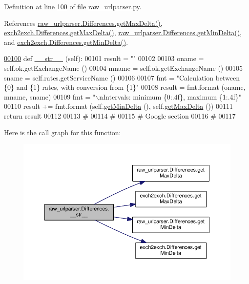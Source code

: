 Definition at line \hyperlink{raw__urlparser_8py_source_l00100}{100} of file \hyperlink{raw__urlparser_8py_source}{raw\+\_\+urlparser.\+py}.



References \hyperlink{raw__urlparser_8py_source_l00097}{raw\+\_\+urlparser.\+Differences.\+get\+Max\+Delta()}, \hyperlink{exch2exch_8py_source_l00130}{exch2exch.\+Differences.\+get\+Max\+Delta()}, \hyperlink{raw__urlparser_8py_source_l00094}{raw\+\_\+urlparser.\+Differences.\+get\+Min\+Delta()}, and \hyperlink{exch2exch_8py_source_l00127}{exch2exch.\+Differences.\+get\+Min\+Delta()}.


\begin{DoxyCode}
\hypertarget{classraw__urlparser_1_1_differences.tex_l00100}{}\hyperlink{classraw__urlparser_1_1_differences_ae30a248dbbe9fde42b0bcbd81160f070}{00100}     \textcolor{keyword}{def }\hyperlink{classraw__urlparser_1_1_differences_ae30a248dbbe9fde42b0bcbd81160f070}{\_\_str\_\_} (self):
00101         result = \textcolor{stringliteral}{""}
00102         
00103         oname = self.ok.getExchangeName ()
00104         mname = self.ok.getExchangeName ()
00105         sname = self.rates.getServiceName ()
00106         
00107         fmt = \textcolor{stringliteral}{"Calculation between \{0\} and \{1\} rates, with conversion from \{1\}"}
00108         result = fmt.format (oname, mname, sname)
00109         fmt = \textcolor{stringliteral}{"\(\backslash\)nIntervals: minimum \{0:.4f\}, maximum \{1:.4f\}"}
00110         result += fmt.format (self.\hyperlink{classraw__urlparser_1_1_differences_af19faaea85ca8ac0d327c8443ddd99ef}{getMinDelta} (), self.\hyperlink{classraw__urlparser_1_1_differences_acfa09d743c08cc813a5bc435aa6875da}{getMaxDelta} ())
00111         \textcolor{keywordflow}{return} result
00112 
00113 \textcolor{comment}{#        }
00114 \textcolor{comment}{# }
00115 \textcolor{comment}{# Google section }
00116 \textcolor{comment}{#}
00117 
\end{DoxyCode}


Here is the call graph for this function\+:\nopagebreak
\begin{figure}[H]
\begin{center}
\leavevmode
\includegraphics[width=350pt]{classraw__urlparser_1_1_differences_ae30a248dbbe9fde42b0bcbd81160f070_cgraph}
\end{center}
\end{figure}



